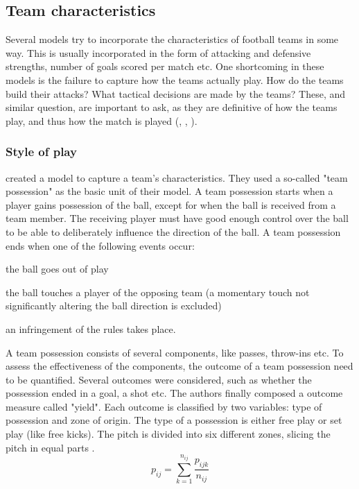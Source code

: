 \subsection{Team characteristics}
\label{subsec:variables-team-characteristics}

Several models try to incorporate the characteristics of football teams in some way. This is usually incorporated in the form of attacking and defensive strengths, number of goals scored per match etc. One shortcoming in these models is the failure to capture how the teams actually play. How do the teams build their attacks? What tactical decisions are made by the teams? These, and similar question, are important to ask, as they are definitive of how the teams play, and thus how the match is played (\citet{bib:pollard-reep-1997}, \citet{bib:bialkowski-lucey-carr-yue-sridharan-matthews-2014}, \citet{bib:hirotsu-wright-2003}).

\subsubsection{Style of play}

\citet{bib:pollard-reep-1997} created a model to capture a team's characteristics. They used a so-called "team possession" as the basic unit of their model. A team possession starts when a player gains possession of the ball, except for when the ball is received from a team member. The receiving player must have good enough control over the ball to be able to deliberately influence the direction of the ball. A team possession ends when one of the following events occur:
\begin{enumerate*}[label={\alph*)}]
    \item the ball goes out of play
    \item the ball touches a player of the opposing team (a momentary touch not significantly altering the ball direction is excluded)
    \item an infringement of the rules takes place.
\end{enumerate*}

A team possession consists of several components, like passes, throw-ins etc. To assess the effectiveness of the components, the outcome of a team possession need to be quantified. Several outcomes were considered, such as whether the possession ended in a goal, a shot etc. The authors finally composed a outcome measure called "yield". Each outcome is classified by two variables: type of possession and zone of origin. The type of a possession is either free play or set play (like free kicks). The pitch is divided into six different zones, slicing the pitch in equal parts \citep{bib:pollard-reep-1997}.
\begin{equation}
    p_{ij} = \sum_{k=1}^{n_{ij}} \frac{p_{ijk}}{n_{ij}}
    \label{eq:team-possession-probability}
\end{equation}

